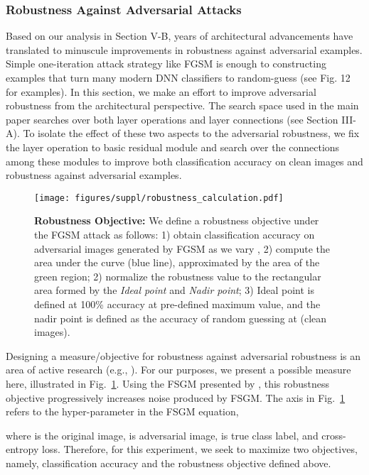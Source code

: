 \documentclass[journal]{IEEEtran}
\theoremstyle{definition}
\theoremstyle{remark}
\begin{document}
\subsubsection{Robustness Against Adversarial Attacks}
Based on our analysis in Section V-B, years of architectural advancements have translated to minuscule improvements in robustness against adversarial examples. Simple one-iteration attack strategy like FGSM \cite{goodfellow2014explaining} is enough to constructing examples that turn many modern DNN classifiers to random-guess (see Fig. 12 for examples). In this section, we make an effort to improve adversarial robustness from the architectural perspective. The search space used in the main paper searches over both layer operations and layer connections (see Section III-A). To isolate the effect of these two aspects to the adversarial robustness, we fix the layer operation to basic residual module \cite{resnet} and search over the connections among these modules to improve both classification accuracy on clean images and robustness against adversarial examples.

\begin{figure}[!htbp]
    \centering
    \texttt{[image: figures/suppl/robustness\_calculation.pdf]}
    \caption{\textbf{Robustness Objective:} We define a robustness objective under the FGSM \cite{goodfellow2014explaining} attack as follows: 1) obtain classification accuracy on adversarial images generated by FGSM as we vary , 2) compute the area under the curve (blue line), approximated by the area of the green region; 2) normalize the robustness value to the rectangular area formed by the \textit{Ideal point} and \textit{Nadir point}; 3) Ideal point is defined at 100\% accuracy at pre-defined maximum  value, and the nadir point is defined as the accuracy of random guessing at  (clean images).}
    \label{fig:robustness_calculation}
\end{figure}

Designing a measure/objective for robustness against adversarial robustness is an area of active research (e.g., \cite{carlini2017towards}). For our purposes, we present a possible measure here, illustrated in Fig.~\ref{fig:robustness_calculation}. Using the FSGM presented by \cite{goodfellow2014explaining}, this robustness objective  progressively increases noise produced by FSGM. The  axis in Fig.~\ref{fig:robustness_calculation} refers to the hyper-parameter in the FSGM equation,

\noindent where  is the original image,  is adversarial image,  is true class label, and  cross-entropy loss. Therefore, for this experiment, we seek to maximize two objectives, namely, classification accuracy and the robustness objective defined above.
\end{document}
